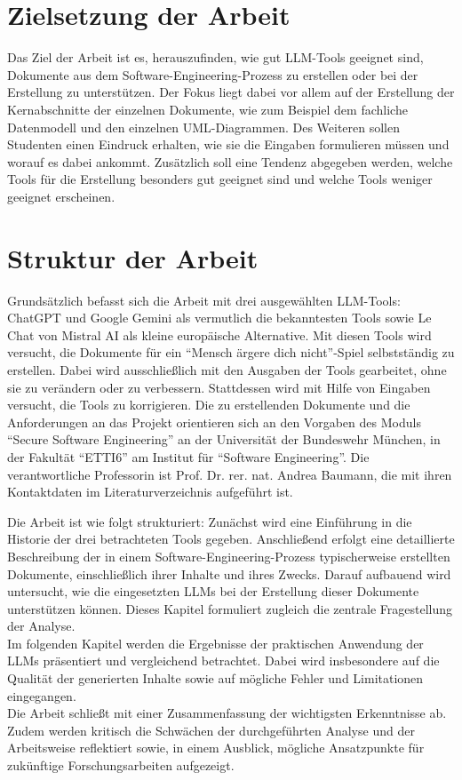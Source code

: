 \section{Zielsetzung der Arbeit}  \label{Zielsetzung der Arbeit}

Das Ziel der Arbeit ist es, herauszufinden, wie gut LLM-Tools geeignet sind, Dokumente aus dem Software-Engineering-Prozess zu 
erstellen oder bei der Erstellung zu unterstützen. Der Fokus liegt dabei vor allem auf der Erstellung der Kernabschnitte der 
einzelnen Dokumente, wie zum Beispiel dem fachliche Datenmodell und den einzelnen UML-Diagrammen. Des Weiteren sollen Studenten 
einen Eindruck erhalten, wie sie die Eingaben formulieren müssen und worauf es dabei ankommt. Zusätzlich soll eine Tendenz 
abgegeben werden, welche Tools für die Erstellung besonders gut geeignet sind und welche Tools weniger geeignet erscheinen. 

\section{Struktur der Arbeit}  \label{Struktur der Arbeit}

Grundsätzlich befasst sich die Arbeit mit drei ausgewählten LLM-Tools: ChatGPT und Google Gemini als vermutlich die 
bekanntesten Tools sowie Le Chat von Mistral AI als kleine europäische Alternative. Mit diesen Tools wird versucht, 
die Dokumente für ein ``Mensch ärgere dich nicht''-Spiel selbstständig zu erstellen. Dabei wird ausschließlich mit den 
Ausgaben der Tools gearbeitet, ohne sie zu verändern oder zu verbessern. Stattdessen wird mit Hilfe von Eingaben 
versucht, die Tools zu korrigieren. Die zu erstellenden Dokumente und die Anforderungen an das Projekt orientieren 
sich an den Vorgaben des Moduls ``Secure Software Engineering'' an der Universität der Bundeswehr München, in der 
Fakultät ``ETTI6'' am Institut für ``Software Engineering''. Die verantwortliche Professorin ist Prof. Dr. rer. nat. Andrea Baumann, 
die mit ihren Kontaktdaten im Literaturverzeichnis aufgeführt ist.

Die Arbeit ist wie folgt strukturiert: Zunächst wird eine Einführung in die Historie der drei betrachteten Tools gegeben. 
Anschließend erfolgt eine detaillierte Beschreibung der in einem Software-Engineering-Prozess typischerweise erstellten 
Dokumente, einschließlich ihrer Inhalte und ihres Zwecks. Darauf aufbauend wird untersucht, wie die eingesetzten LLMs bei 
der Erstellung dieser Dokumente unterstützen können. Dieses Kapitel formuliert zugleich die 
zentrale Fragestellung der Analyse.\\
Im folgenden Kapitel werden die Ergebnisse der praktischen Anwendung der LLMs präsentiert und vergleichend betrachtet. 
Dabei wird insbesondere auf die Qualität der generierten Inhalte sowie auf mögliche Fehler und Limitationen eingegangen.\\
Die Arbeit schließt mit einer Zusammenfassung der wichtigsten Erkenntnisse ab. Zudem werden kritisch die Schwächen der 
durchgeführten Analyse und der Arbeitsweise reflektiert sowie, in einem Ausblick, mögliche Ansatzpunkte für zukünftige Forschungsarbeiten aufgezeigt.

